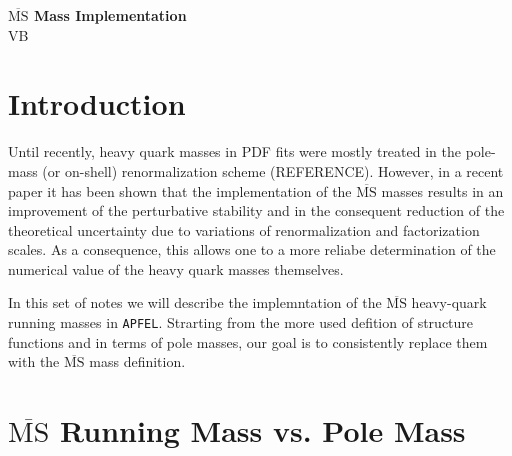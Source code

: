 \documentclass[10pt,a4paper]{article}
\begin{document}
\begin{center}
\textbf{\Large $\overline{\mbox{MS}}$ Mass Implementation}\\
{\large VB}
\end{center}

\tableofcontents

\newpage

\section{Introduction}

Until recently, heavy quark masses in PDF fits were mostly treated in
the pole-mass (or on-shell) renormalization scheme
(REFERENCE). However, in a recent paper \cite{Alekhin:2010sv} it has
been shown that the implementation of the $\overline{\mbox{MS}}$
masses results in an improvement of the perturbative stability and in
the consequent reduction of the theoretical uncertainty due to
variations of renormalization and factorization scales.  As a
consequence, this allows one to a more reliabe determination of the
numerical value of the heavy quark masses themselves.

In this set of notes we will describe the implemntation of the
$\overline{\mbox{MS}}$ heavy-quark running masses in {\tt APFEL}.
Strarting from the more used defition of structure functions and in
terms of pole masses, our goal is to consistently replace them with
the $\overline{\mbox{MS}}$ mass definition.

\section{$\overline{\mbox{MS}}$ Running Mass vs. Pole Mass}
\end{document}
